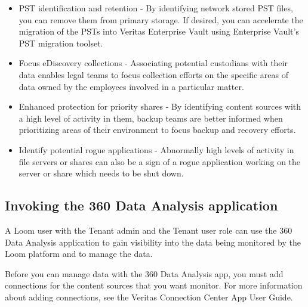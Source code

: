 \documentclass[letterpaper,10pt,english]{sphinxmanual}
\begin{document}
\begin{itemize}
\item {} 
PST identification and retention - By identifying network stored PST files, you can remove them from primary storage. If desired, you can accelerate the migration of the PSTs into Veritas Enterprise Vault using Enterprise Vault’s PST migration toolset.

\end{itemize}

\begin{itemize}
\item {} 
Focus eDiscovery collections - Associating potential custodians with their data enables legal teams to focus collection efforts on the specific areas of data owned by the employees involved in a particular matter.

\item {} 
Enhanced protection for priority shares - By identifying content sources with a high level of activity in them, backup teams are better informed when prioritizing areas of their environment to focus backup and recovery efforts.

\item {} 
Identify potential rogue applications - Abnormally high levels of activity in file servers or shares can also be a sign of a rogue application working on the server or share which needs to be shut down.

\end{itemize}


\subsection{Invoking the 360 Data Analysis application}
\label{\detokenize{mcdmp_app_ug:invoking-the-360-data-analysis-application}}
A Loom user with the Tenant admin and the Tenant user role can use the 360 Data Analysis application to gain visibility into the data being monitored by the Loom platform and to manage the data.

Before you can manage data with the 360 Data Analysis app, you must add connections for the content sources that you want monitor. For more information about adding connections, see the Veritas Connection Center App User Guide.
\end{document}
